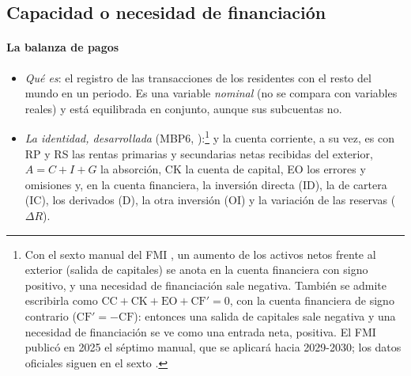 \documentclass[11pt]{article}
\begin{document}
\subsection{Capacidad o necesidad de financiación}\label{sec:cuenta-corriente}

\paragraph{La balanza de pagos}
\begin{itemize}
\item \emph{Qué es}: el registro de las transacciones de los residentes con el resto del mundo en un periodo. Es una variable \emph{nominal} (no se compara con variables reales) y está equilibrada en conjunto, aunque sus subcuentas no.
\item \emph{La identidad, desarrollada} (MBP6, ):\footnote{Con el sexto manual del FMI \parencite{FMI2009MBP6}, un aumento de los activos netos frente al exterior (salida de capitales) se anota en la cuenta financiera con signo positivo, y una necesidad de financiación sale negativa. También se admite escribirla como $\mathrm{CC}+\mathrm{CK}+\mathrm{EO}+\mathrm{CF}'=0$, con la cuenta financiera de signo contrario ($\mathrm{CF}'=-\mathrm{CF}$): entonces una salida de capitales sale negativa y una necesidad de financiación se ve como una entrada neta, positiva. El FMI publicó en 2025 el séptimo manual, que se aplicará hacia 2029-2030; los datos oficiales siguen en el sexto \parencite{FMI2025MBP7}.}
y la cuenta corriente, a su vez, es
con RP y RS las rentas primarias y secundarias netas recibidas del exterior, $A=C+I+G$ la absorción, CK la cuenta de capital, EO los errores y omisiones y, en la cuenta financiera, la inversión directa (ID), la de cartera (IC), los derivados (D), la otra inversión (OI) y la variación de las reservas ($\Delta R$).

\end{itemize}
\end{document}
